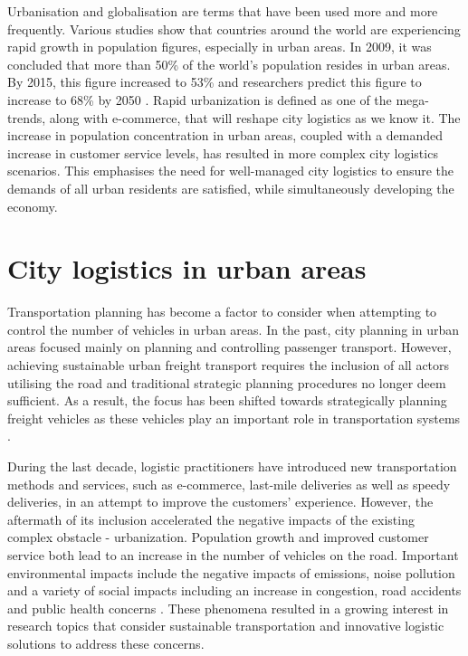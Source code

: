  Urbanisation and globalisation are terms that have been used more and more frequently. Various studies show that countries around the world are experiencing rapid growth in population figures, especially in urban areas. In 2009, it was concluded that more than 50\% of the world's population resides in urban areas. By 2015, this figure increased to 53\% and researchers predict this figure to increase to 68\% by 2050 \citep{moreno2016urbanization}. Rapid urbanization is defined as one of the mega-trends, along with e-commerce, that will reshape city logistics as we know it. The increase in population concentration in urban areas, coupled with a demanded increase in customer service levels, has resulted in more complex city logistics scenarios. This emphasises the need for well-managed city logistics to ensure the demands of all urban residents are satisfied, while simultaneously developing the economy.\par

\section{City logistics in urban areas}
 Transportation planning has become a factor to consider when attempting to control the number of vehicles in urban areas. In the past, city planning in urban areas focused mainly on planning and controlling passenger transport. However, achieving sustainable urban freight transport requires the inclusion of all actors utilising the road and traditional strategic planning procedures no longer deem sufficient. As a result, the focus has been shifted towards strategically planning freight vehicles as these vehicles play an important role in transportation systems \citep{bean2018}.

During the last decade, logistic practitioners have introduced new transportation methods and services, such as e-commerce, last-mile deliveries as well as speedy deliveries, in an attempt to improve the customers' experience. However, the aftermath of its inclusion accelerated the negative impacts of the existing complex obstacle - urbanization. Population growth and improved customer service both lead to an increase in the number of vehicles on the road. Important environmental impacts include the negative impacts of emissions, noise pollution and a variety of social impacts including an increase in congestion, road accidents and public health concerns \citep{gonzalez2012defining}. These phenomena resulted in a growing interest in research topics that consider sustainable transportation and innovative logistic solutions to address these concerns. \par
 
